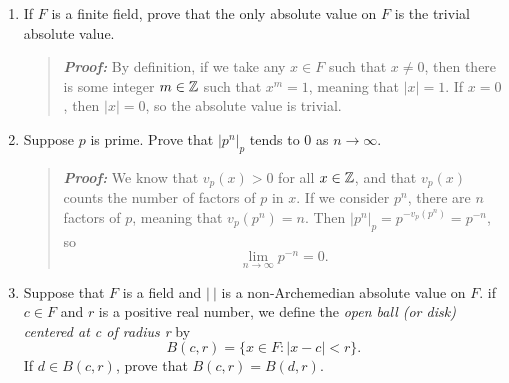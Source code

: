 \documentclass{hw}
\begin{document}

\begin{enumerate}
\item If $F$ is a finite field, prove that the only absolute value on $F$ is the trivial absolute
value.
\begin{quote}
\textit{\textbf{Proof:}} By definition, if we take any $x\in F$ such that $x\neq0$, then there is some
integer $m\in\mathbb{Z}$ such that $x^{m}=1$, meaning that $|x|=1$. If $x=0$, then $|x|=0$, so the absolute
value is trivial.
\end{quote}

\item Suppose $p$ is prime. Prove that $|p^{n}|_{p}$ tends to 0 as $n\to\infty$.
\begin{quote}
\textit{\textbf{Proof:}} We know that $v_{p}(x)>0$ for all $x\in\mathbb{Z}$, and that $v_{p}(x)$ counts the
number of factors of $p$ in $x$. If we consider $p^n$, there are $n$ factors of $p$, meaning that
$v_{p}(p^{n})=n$. Then $|p^{n}|_{p}=p^{-v_{p}(p^{n})}=p^{-n}$, so
\[
\lim_{n\to\infty}p^{-n}=0.
\]
\end{quote}

\item Suppose that $F$ is a field and $|\ |$ is a non-Archemedian absolute value on $F$. if $c\in F$
and $r$ is a positive real number, we define the \textit{open ball (or disk) centered at c of radius r}
by
\[
B(c,r)=\{x\in F:|x-c|<r\}.
\]
If $d\in B(c,r)$, prove that $B(c,r)=B(d,r)$.
\end{enumerate}
\end{document}
